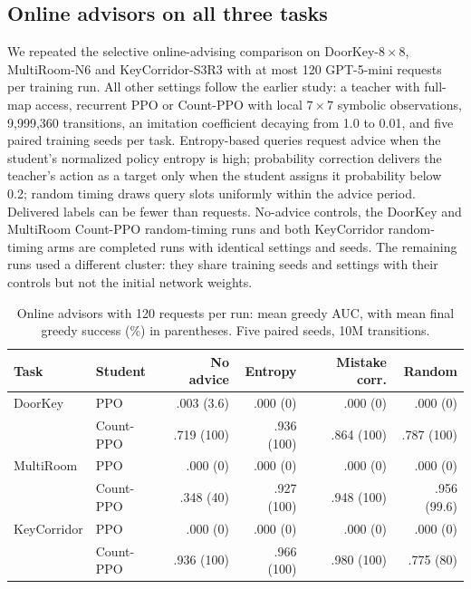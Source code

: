 \subsection{Online advisors on all three tasks}
\label{sec:supp:online120}

We repeated the selective online-advising comparison on DoorKey-$8\times8$,
MultiRoom-N6 and KeyCorridor-S3R3 with at most 120 GPT-5-mini requests per
training run. All other settings follow the earlier study: a teacher with
full-map access, recurrent PPO or Count-PPO with local $7\times7$ symbolic
observations, 9,999,360 transitions, an imitation coefficient decaying from
1.0 to 0.01, and five paired training seeds per task. Entropy-based queries
request advice when the student's normalized policy entropy is high;
probability correction delivers the teacher's action as a target only when
the student assigns it probability below 0.2; random timing draws query
slots uniformly within the advice period. Delivered labels can be fewer
than requests. No-advice controls, the DoorKey and MultiRoom Count-PPO
random-timing runs and both KeyCorridor random-timing arms are completed
runs with identical settings and seeds. The remaining runs used a different
cluster: they share training seeds and settings with their controls but
not the initial network weights.

\begin{table}[htbp]\centering\small
\setlength{\tabcolsep}{4pt}
\caption{Online advisors with 120 requests per run: mean greedy AUC, with
mean final greedy success (\%) in parentheses. Five paired seeds, 10M
transitions.}
\label{tab:supp:online120}
\begin{tabular}{@{}llrrrr@{}}
\toprule
Task & Student & No advice & Entropy & Mistake corr. & Random \\
\midrule
DoorKey     & PPO       & .003 (3.6) & .000 (0) & .000 (0) & .000 (0) \\
            & Count-PPO & .719 (100) & .936 (100) & .864 (100) & .787 (100) \\
MultiRoom   & PPO       & .000 (0) & .000 (0) & .000 (0) & .000 (0) \\
            & Count-PPO & .348 (40) & .927 (100) & .948 (100) & .956 (99.6) \\
KeyCorridor & PPO       & .000 (0) & .000 (0) & .000 (0) & .000 (0) \\
            & Count-PPO & .936 (100) & .966 (100) & .980 (100) & .775 (80) \\
\bottomrule
\end{tabular}
\end{table}

